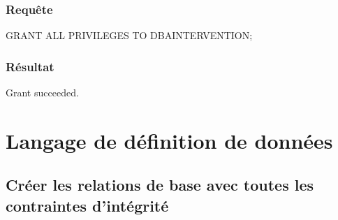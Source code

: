 \documentclass[•]{article}
\begin{document}
\subsubsection{Requête}
\begin{sql}
GRANT ALL PRIVILEGES TO DBAINTERVENTION;
\end{sql}
\subsubsection{Résultat}
\begin{sql}
Grant succeeded.
\end{sql}
\section{Langage de définition de données}
\subsection{Créer les relations de base avec toutes les contraintes d’intégrité}
\end{document}
